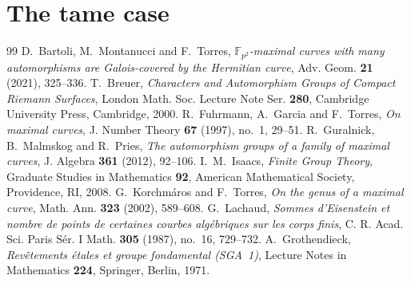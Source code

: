 \documentclass[10pt,a4paper]{amsart}
\newcommand{\F}{\mathbb F}
\begin{document}
\section{The tame case}\label{sec:tame}


\begin{thebibliography}{99}
 D.~Bartoli, M.~Montanucci and F.~Torres, \emph{$\F_{p^2}$-maximal curves with many automorphisms are Galois-covered by the Hermitian curve}, Adv. Geom. \textbf{21} (2021), 325--336.
 T.~Breuer, \emph{Characters and Automorphism Groups of Compact Riemann Surfaces}, London Math. Soc. Lecture Note Ser. \textbf{280}, Cambridge University Press, Cambridge, 2000.
 R.~Fuhrmann, A.~Garcia and F.~Torres, \emph{On maximal curves}, J. Number Theory \textbf{67} (1997), no.~1, 29--51.
 R.~Guralnick, B.~Malmskog and R.~Pries, \emph{The automorphism groups of a family of maximal curves}, J. Algebra \textbf{361} (2012), 92--106.
 I.~M.~Isaacs, \emph{Finite Group Theory}, Graduate Studies in Mathematics \textbf{92}, American Mathematical Society, Providence, RI, 2008.
 G.~Korchm\'aros and F.~Torres, \emph{On the genus of a maximal curve}, Math. Ann. \textbf{323} (2002), 589--608.
 G.~Lachaud, \emph{Sommes d'Eisenstein et nombre de points de certaines courbes alg\'ebriques sur les corps finis}, C. R. Acad. Sci. Paris S\'er. I Math. \textbf{305} (1987), no.~16, 729--732.
 A.~Grothendieck, \emph{Rev\^etements \'etales et groupe fondamental (SGA~1)}, Lecture Notes in Mathematics \textbf{224}, Springer, Berlin, 1971.
\end{thebibliography}
\end{document}
